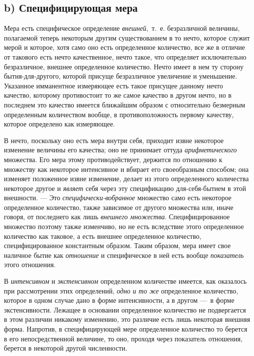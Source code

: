 \subsection[b) Специфицирующая мера]{b) Специфицирующая мера}
Мера есть специфическое определение
{\em внешней},~т.~е. безразличной величины, полагаемой
теперь некоторым другим существованием в то нечто, которое служит мерой и
которое, хотя само оно есть определенное количество, все же в отличие от
такового есть нечто качественное, нечто такое, что определяет исключительно
безразличное, внешнее определенное количество. Нечто имеет в нем ту сторону
бытия-для-другого, которой присуще безразличное увеличение и уменьшение.
Указанное имманентное измеряющее есть такое присущее данному нечто
качество, которому противостоит то же самое качество в другом нечто, но в
последнем это качество имеется ближайшим образом с относительно безмерным
определенным количеством вообще, в противоположность первому качеству,
которое определено как измеряющее.

В нечто, поскольку оно есть мера внутри себя, приходит извне некоторое
изменение величины его качества; оно не принимает оттуда
{\em арифметического} множества. Его мера этому
противодействует, держится по отношению к множеству как некоторое
интенсивное и вбирает его своеобразным способом; она изменяет положенное
извне изменение, делает из этого определенного количества некоторое другое
и {\em являет} себя через эту спецификацию
для-себя-бытием в этой внешности. — Это
{\em специфически-вобранное} множество само есть
некоторое определенное количество, также зависимое от другого множества
или, иначе говоря, от последнего как лишь {\em внешнего
множества}. Специфицированное множество поэтому также изменчиво, но не есть
вследствие этого определенное количество как таковое, а есть внешнее
определенное количество, специфицированное константным образом. Таким
образом, мера имеет свое наличное бытие как
{\em отношение} и специфическое в ней есть вообще
{\em показатель} этого отношения.

В {\em интенсивном} и
{\em экстенсивном} определенном количестве имеется, как
оказалось при рассмотрении этих определений, {\em одно
и то же} определенное количество, которое в одном случае дано в форме
интенсивности, а в другом —~в форме экстенсивности. Лежащее в основании
определенное количество не подвергается в этом различии никакому изменению,
это различие есть лишь некоторая внешняя форма. Напротив, в специфицирующей
мере определенное количество то берется в его непосредственной величине, то
оно, проходя через показатель отношения, берется в некоторой другой
численности.

